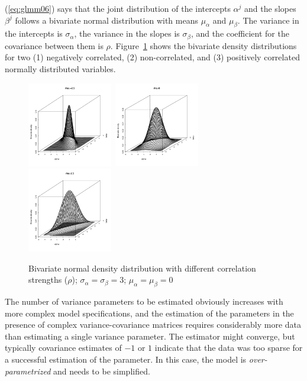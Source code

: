 \documentclass[a4paper,12pt]{article}
\begin{document}
(\ref{eq:glmm06}) says that the joint distribution of the intercepts $\alpha^j$ and the slopes $\beta^j$ follows a bivariate normal distribution with means $\mu_{\alpha}$ and $\mu_{\beta}$.
The variance in the intercepts is $\sigma_{\alpha}$, the variance in the slopes is $\sigma_{\beta}$, and the coefficient for the covariance between them is $\rho$.
Figure~\ref{fig:multnorm} shows the bivariate density distributions for two (1) negatively correlated, (2) non-correlated, and (3) positively correlated normally distributed variables.

\begin{figure}[!htpb]
  \centering
  \includegraphics[width=0.33\textwidth]{graphics/multnorm1}~\includegraphics[width=0.33\textwidth]{graphics/multnorm2}~\includegraphics[width=0.33\textwidth]{graphics/multnorm3}
  \caption{Bivariate normal density distribution with different correlation strengths ($\rho$); $\sigma_{\alpha}=\sigma_{\beta}=3$; $\mu_{\alpha}=\mu_{\beta}=0$}
  \label{fig:multnorm}
\end{figure}

The number of variance parameters to be estimated obviously increases with more complex model specifications, and the estimation of the parameters in the presence of complex variance-covariance matrices requires considerably more data than estimating a single variance parameter.
The estimator might converge, but typically covariance estimates of $-1$ or $1$ indicate that the data was too sparse for a successful estimation of the parameter.
In this case, the model is \textit{over-parametrized} and needs to be simplified.
\end{document}

